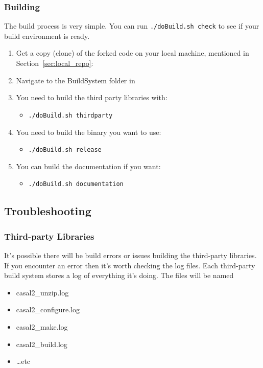 \subsubsection{Building \CNAME}
The build process is very simple. You can run \texttt{./doBuild.sh check} to see if your build environment is ready.
\begin{enumerate}
	\item Get a copy (clone) of the forked code on your local machine, mentioned in Section~\ref{sec:local_repo}: 
	
	\item Navigate to the BuildSystem folder in 
	\item You need to build the third party libraries with:
	\begin{itemize}
		\item \texttt{./doBuild.sh thirdparty}
	\end{itemize}
	\item You need to build the binary you want to use:
	\begin{itemize}
		\item \texttt{./doBuild.sh release}
	\end{itemize}	
	
	\item You can build the documentation if you want:
	\begin{itemize}
		\item \texttt{./doBuild.sh documentation}
	\end{itemize}		
\end{enumerate}



\subsection{Troubleshooting}
\subsubsection{Third-party Libraries}
It’s possible there will be build errors or issues building the third-party libraries. If you encounter an error then it’s worth checking the log files. Each third-party build system stores a log of everything it’s doing. The files will be named
\begin{itemize}
\item casal2\_unzip.log
\item casal2\_configure.log
\item casal2\_make.log
\item casal2\_build.log
\item \dots etc
\end{itemize}


